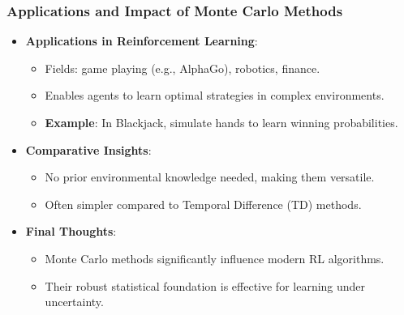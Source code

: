 \documentclass[aspectratio=169]{beamer}
\begin{document}
\begin{frame}[fragile]
    \frametitle{Applications and Impact of Monte Carlo Methods}
    \begin{itemize}
        \item \textbf{Applications in Reinforcement Learning}:
            \begin{itemize}
                \item Fields: game playing (e.g., AlphaGo), robotics, finance.
                \item Enables agents to learn optimal strategies in complex environments.
                \item \textbf{Example}: In Blackjack, simulate hands to learn winning probabilities.
            \end{itemize}
        
        \item \textbf{Comparative Insights}:
            \begin{itemize}
                \item No prior environmental knowledge needed, making them versatile.
                \item Often simpler compared to Temporal Difference (TD) methods.
            \end{itemize}

        \item \textbf{Final Thoughts}:
            \begin{itemize}
                \item Monte Carlo methods significantly influence modern RL algorithms.
                \item Their robust statistical foundation is effective for learning under uncertainty.
            \end{itemize}
    \end{itemize}
\end{frame}
\end{document}
